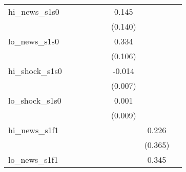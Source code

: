 {\begin{tabular}{l*{8}{c}}
\addlinespace
hi\_news\_s1s0&                     &                     &                     &                     &                     &       0.145         &                     &                     \\
            &                     &                     &                     &                     &                     &     (0.140)         &                     &                     \\
\addlinespace
lo\_news\_s1s0&                     &                     &                     &                     &                     &       0.334\sym{***}&                     &                     \\
            &                     &                     &                     &                     &                     &     (0.106)         &                     &                     \\
\addlinespace
hi\_shock\_s1s0&                     &                     &                     &                     &                     &      -0.014\sym{*}  &                     &                     \\
            &                     &                     &                     &                     &                     &     (0.007)         &                     &                     \\
\addlinespace
lo\_shock\_s1s0&                     &                     &                     &                     &                     &       0.001         &                     &                     \\
            &                     &                     &                     &                     &                     &     (0.009)         &                     &                     \\
\addlinespace
hi\_news\_s1f1&                     &                     &                     &                     &                     &                     &       0.226         &                     \\
            &                     &                     &                     &                     &                     &                     &     (0.365)         &                     \\
\addlinespace
lo\_news\_s1f1&                     &                     &                     &                     &                     &                     &       0.345         &                     \\

\end{tabular}}
